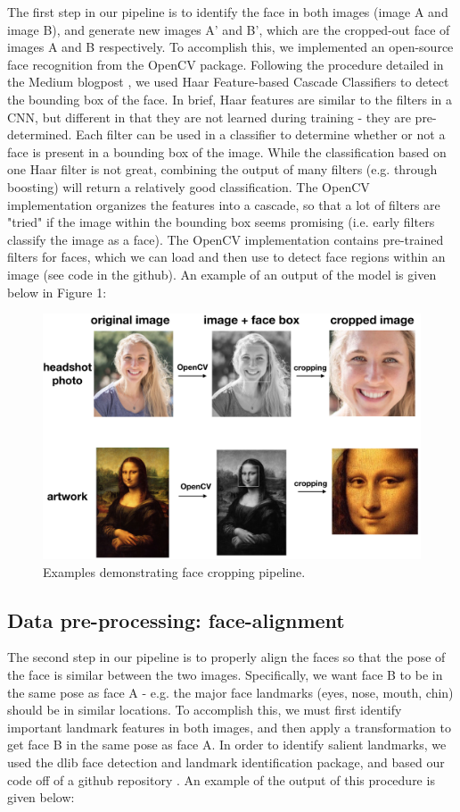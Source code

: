 \documentclass{pnastwo2}
\begin{document}
\begin{article}
The first step in our pipeline is to identify the face in both images (image A and image B), and generate new images A' and B', which are the cropped-out face of images A and B respectively. To accomplish this, we implemented an open-source face recognition from the OpenCV package. Following the procedure detailed in the Medium blogpost \cite{Medium}, we used Haar Feature-based Cascade Classifiers to detect the bounding box of the face. In brief, Haar features are similar to the filters in a CNN, but different in that they are not learned during training - they are pre-determined. Each filter can be used in a classifier to determine whether or not a face is present in a bounding box of the image. While the classification based on one Haar filter is not great, combining the output of many filters (e.g. through boosting) will return a relatively good classification. The OpenCV implementation organizes the features into a cascade, so that a lot of filters are "tried" if the image within the bounding box seems promising (i.e. early filters classify the image as a face). The OpenCV implementation contains pre-trained filters for faces, which we can load and then use to detect face regions within an image (see code in the github). An example of an output of the model is given below in Figure 1:

\begin{figure}[ht]
	\begin{center}
		\includegraphics[width=.45\textwidth]{face_crop_figure}
		\caption{Examples demonstrating face cropping pipeline.} \label{fig:face_crop}
	\end{center}
\end{figure} 

\subsection{Data pre-processing: face-alignment}

The second step in our pipeline is to properly align the faces so that the pose of the face is similar between the two images. Specifically, we want face B to be in the same pose as face A - e.g. the major face landmarks (eyes, nose, mouth, chin) should be in similar locations. To accomplish this, we must first identify important landmark features in both images, and then apply a transformation to get face B in the same pose as face A. In order to identify salient landmarks, we used the dlib face detection and landmark identification package, and based our code off of a github repository \cite{dlib}. An example of the output of this procedure is given below:


\end{article}
\end{document}
